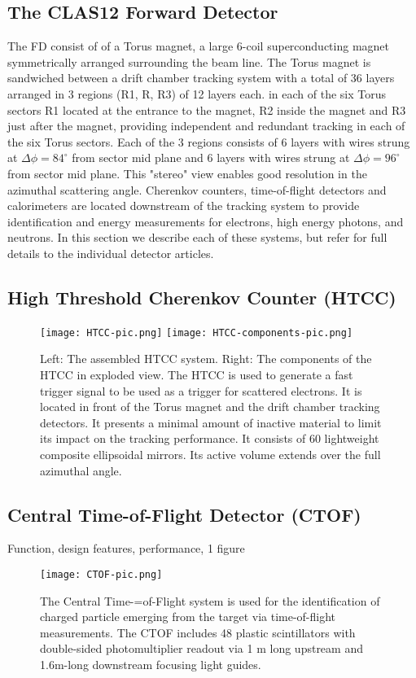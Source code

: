 \subsection{The CLAS12 Forward Detector}
\label{fd}
\vspace{0.3cm}\noindent
The FD consist of of a Torus magnet, a large 6-coil superconducting magnet symmetrically arranged surrounding the beam line.
The Torus magnet is sandwiched between a drift chamber tracking system with a total of 36 layers arranged in 3 regions (R1, R, R3)
of 12 layers each. in each of the six Torus sectors R1  located at the entrance to the magnet, R2 inside the magnet and R3 just after the magnet, providing independent and redundant tracking in each of the six Torus sectors. Each of the 3 regions consists of 6 layers with
wires strung at $\Delta{\phi} = 84^\circ$ from sector mid plane and 6 layers with wires strung at $\Delta{\phi} = 96^\circ$ from
sector mid plane.  This "stereo" view enables good resolution in the azimuthal scattering angle. Cherenkov counters, time-of-flight detectors
and calorimeters are located  downstream of the tracking system to provide identification and energy measurements for
electrons, high energy photons, and neutrons.  In this section we describe each of these systems, but refer for full details to the
individual detector articles.




\subsection{High Threshold Cherenkov Counter (HTCC)}
\label{htcc}
\vspace{2cm}
\begin{figure}[h]
\texttt{[image: HTCC-pic.png]}
\texttt{[image: HTCC-components-pic.png]}
\caption{Left: The assembled HTCC system. Right: The components of the HTCC in exploded view.
The HTCC is used to generate a fast trigger signal to be used as a trigger for scattered electrons.
It is located in front of the Torus magnet and the drift chamber tracking detectors. It presents a minimal amount of
inactive material to limit its impact on the tracking performance. It consists of 60 lightweight composite ellipsoidal
mirrors. Its active volume extends over the full azimuthal angle.  }
\end{figure}
\subsection{Central Time-of-Flight Detector (CTOF)}
Function, design features, performance, 1 figure
\begin{figure}[]
\hspace{3.0cm}\texttt{[image: CTOF-pic.png]}
\caption{The Central Time-=of-Flight system is used for the identification of charged particle emerging
from the target via time-of-flight measurements. The CTOF includes 48 plastic scintillators with
double-sided photomultiplier readout via 1 m long
upstream and 1.6m-long downstream focusing light guides.}
\end{figure}

